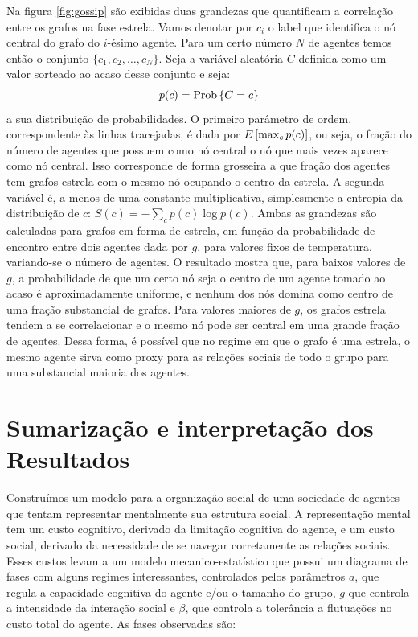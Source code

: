 Na figura \ref{fig:gossip} são exibidas duas grandezas que quantificam a correlação entre os grafos na fase estrela. Vamos denotar por $c_i$ o label que identifica o nó central do grafo do $i$-ésimo agente. Para um certo número $N$ de agentes temos então o conjunto $\{c_1, c_2, \ldots, c_N\}$. Seja a variável aleatória $C$ definida como um valor sorteado ao acaso desse conjunto e seja:
\[
 p(c) = \mathrm{Prob}\left\{C = c\right\}
\]
a sua distribuição de probabilidades. O primeiro parâmetro de ordem, correspondente às linhas tracejadas, é dada por $E\left[\max_{c} p(c)\right]$, ou seja, o fração do número de agentes que possuem como nó central o nó que mais vezes aparece como nó central. Isso corresponde de forma grosseira a que fração dos agentes tem grafos estrela com o mesmo nó ocupando o centro da estrela. A segunda variável é, a menos de uma constante multiplicativa, simplesmente a entropia da distribuição de $c$: $S(c) = -\sum_{c} p(c) \log p(c)$. Ambas as grandezas são calculadas para grafos em forma de estrela, em função da probabilidade de encontro entre dois agentes dada por $g$, para valores fixos de temperatura, variando-se o número de agentes. O resultado mostra que, para baixos valores de $g$, a probabilidade de que um certo nó seja o centro de um agente tomado ao acaso é aproximadamente uniforme, e nenhum dos nós domina como centro de uma fração substancial de grafos. Para valores maiores de $g$, os grafos estrela tendem a se correlacionar e o mesmo nó pode ser central em uma grande fração de agentes. Dessa forma, é possível que no regime em que o grafo é uma estrela, o mesmo agente sirva como proxy para as relações sociais de todo o grupo para uma substancial maioria dos agentes.

\section{Sumarização e interpretação dos Resultados}
Construímos um modelo para a organização social de uma sociedade de agentes que tentam representar mentalmente sua estrutura social. A representação mental tem um custo cognitivo, derivado da limitação cognitiva do agente, e um custo social, derivado da necessidade de se navegar corretamente as relações sociais. Esses custos levam a um modelo mecanico-estatístico que possui um diagrama de fases com alguns regimes interessantes, controlados pelos parâmetros $a$, que regula a capacidade cognitiva do agente e/ou o tamanho do grupo, $g$ que controla a intensidade da interação social e $\beta$, que controla a tolerância a flutuações no custo total do agente. As fases observadas são:

